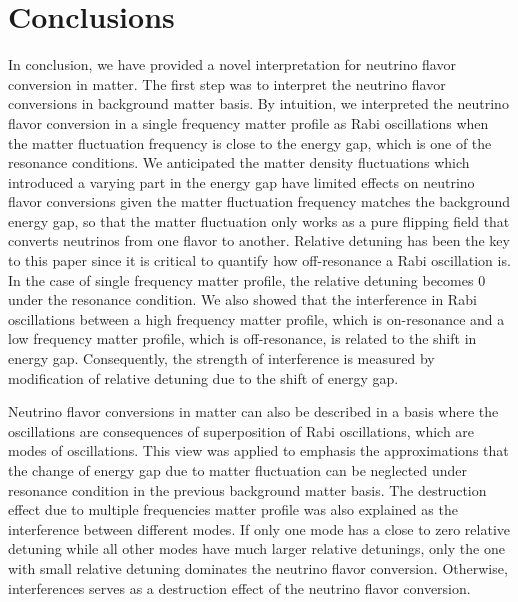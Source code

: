 \documentclass[%
reprint,
 amsmath,amssymb,
 aps,
]{revtex4-1}
\begin{document}
\section{\label{conclusions}Conclusions}



In conclusion, we have provided a novel interpretation for neutrino flavor conversion in matter. The first step was to interpret the neutrino flavor conversions in background matter basis. By intuition, we interpreted the neutrino flavor conversion in a single frequency matter profile as Rabi oscillations when the matter fluctuation frequency is close to the energy gap, which is one of the resonance conditions. We anticipated the matter density fluctuations which introduced a varying part in the energy gap have limited effects on neutrino flavor conversions given the matter fluctuation frequency matches the background energy gap, so that the matter fluctuation only works as a pure flipping field that converts neutrinos from one flavor to another. Relative detuning has been the key to this paper since it is critical to quantify how off-resonance a Rabi oscillation is. In the case of single frequency matter profile, the relative detuning becomes $0$ under the resonance condition. We also showed that the interference in Rabi oscillations between a high frequency matter profile, which is on-resonance and a low frequency matter profile, which is off-resonance, is related to the shift in energy gap. Consequently, the strength of interference is measured by modification of relative detuning due to the shift of energy gap. 

Neutrino flavor conversions in matter can also be described in a basis where the oscillations are consequences of superposition of Rabi oscillations, which are modes of oscillations. This view was applied to emphasis the approximations that the change of energy gap due to matter fluctuation can be neglected under resonance condition in the previous background matter basis. The destruction effect due to multiple frequencies matter profile was also explained as the interference between different modes. If only one mode has a close to zero relative detuning while all other modes have much larger relative detunings, only the one with small relative detuning dominates the neutrino flavor conversion. Otherwise, interferences serves as a destruction effect of the neutrino flavor conversion.
\end{document}
